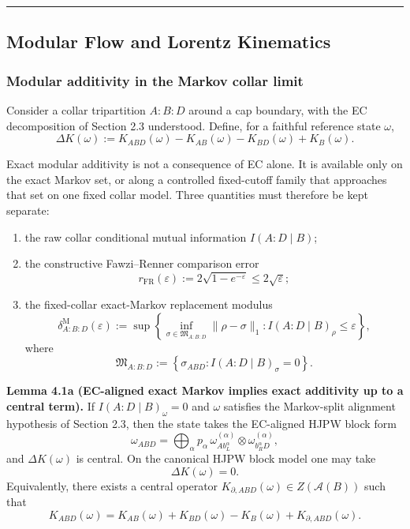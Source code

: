 \begin{center}\rule{0.5\linewidth}{0.5pt}\end{center}
\subsection{Modular Flow and Lorentz Kinematics}\label{4-modular-flow-and-lorentz-kinematics}

\subsubsection{Modular additivity in the Markov collar limit}\label{41-modular-additivity-in-the-markov-collar-limit}

Consider a collar tripartition \(A:B:D\) around a cap boundary, with the EC decomposition of Section 2.3 understood. Define, for a faithful reference state \(\omega\),
\[
\Delta K(\omega)
:=
K_{ABD}(\omega)-K_{AB}(\omega)-K_{BD}(\omega)+K_B(\omega).
\]

Exact modular additivity is not a consequence of EC alone. It is available only on the exact Markov set, or along a controlled fixed-cutoff family that approaches that set on one fixed collar model. Three quantities must therefore be kept separate:
\begin{enumerate}
\item the raw collar conditional mutual information \(I(A:D\mid B)\);
\item the constructive Fawzi--Renner comparison error
\[
r_{\mathrm{FR}}(\varepsilon):=
2\sqrt{1-e^{-\varepsilon}}
\le
2\sqrt{\varepsilon};
\]
\item the fixed-collar exact-Markov replacement modulus
\[
\delta^{\mathrm M}_{A:B:D}(\varepsilon)
:=
\sup\left\{
\inf_{\sigma\in\mathfrak M_{A:B:D}}\|\rho-\sigma\|_1:
I(A:D\mid B)_\rho\le \varepsilon
\right\},
\]
where
\[
\mathfrak M_{A:B:D}
:=
\left\{
\sigma_{ABD}: I(A:D\mid B)_\sigma=0
\right\}.
\]
\end{enumerate}

\textbf{Lemma 4.1a (EC-aligned exact Markov implies exact additivity up to a central term).} If \(I(A:D \mid B)_\omega = 0\) and \(\omega\) satisfies the Markov-split alignment hypothesis of Section 2.3, then the state takes the EC-aligned HJPW block form
\[
\omega_{ABD}
=
\bigoplus_{\alpha}
p_{\alpha}\,
\omega^{(\alpha)}_{A b_L^{\alpha}}
\otimes
\omega^{(\alpha)}_{b_R^{\alpha} D},
\]
and \(\Delta K(\omega)\) is central. On the canonical HJPW block model one may take
\[
\Delta K(\omega)=0.
\]
Equivalently, there exists a central operator \(K_{\partial,ABD}(\omega)\in Z(\mathcal A(B))\) such that
\[
K_{ABD}(\omega)
=
K_{AB}(\omega)+K_{BD}(\omega)-K_B(\omega)+K_{\partial,ABD}(\omega).
\]

